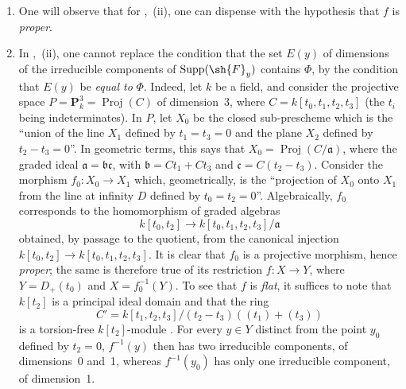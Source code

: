 \begin{remarks}[12.2.3]
\label{IV.12.2.3}
\begin{enumerate}[label=(\roman*)]
  \item One will observe that for ,~(ii), one can dispense with the hypothesis that $f$ is \emph{proper}.

  \item In ,~(ii), one cannot replace the condition that the set $E(y)$ of dimensions of the irreducible components of $\operatorname{Supp}(\sh{F}_y)$ contains $\Phi$, by the condition that $E(y)$ be \emph{equal to} $\Phi$.
Indeed, let $k$ be a field, and consider the projective space $P=\mathbf{P}_k^3=\operatorname{Proj}(C)$ of dimension~$3$, where $C=k[t_0,t_1,t_2,t_3]$ (the $t_i$ being indeterminates). In $P$, let $X_0$ be the closed sub-prescheme which is the ``union of the line $X_1$ defined by $t_1=t_3=0$ and the plane $X_2$ defined by $t_2-t_3=0$''. In geometric terms, this says that $X_0=\operatorname{Proj}(C/\mathfrak{a})$, where the graded ideal $\mathfrak{a}=\mathfrak{b}\mathfrak{c}$, with $\mathfrak{b}=Ct_1+Ct_3$ and $\mathfrak{c}=C(t_2-t_3)$. Consider the morphism $f_0:X_0\to X_1$ which, geometrically, is the ``projection of $X_0$ onto $X_1$ from the line at infinity $D$ defined by $t_0=t_2=0$''. Algebraically, $f_0$ corresponds to the homomorphism of graded algebras
\[
  k[t_0,t_2]\longrightarrow k[t_0,t_1,t_2,t_3]/\mathfrak{a}
\]
obtained, by passage to the quotient, from the canonical injection $k[t_0,t_2]\to k[t_0,t_1,t_2,t_3]$.
It is clear that $f_0$ is a projective morphism, hence \emph{proper}; the same is therefore true of its restriction $f:X\to Y$, where $Y=D_+(t_0)$ and $X=f_0^{-1}(Y)$. To see that $f$ is \emph{flat}, it suffices to note that $k[t_2]$ is a principal ideal domain and that the ring
\[
  C'=k[t_1,t_2,t_3]/(t_2-t_3)((t_1)+(t_3))
\]
is a torsion-free $k[t_2]$-module .
For every $y\in Y$ distinct from the point $y_0$ defined by $t_2=0$, $f^{-1}(y)$ then has two irreducible components, of dimensions~0 and~1, whereas $f^{-1}(y_0)$ has only one irreducible component, of dimension~1.


\end{enumerate}
\end{remarks}
